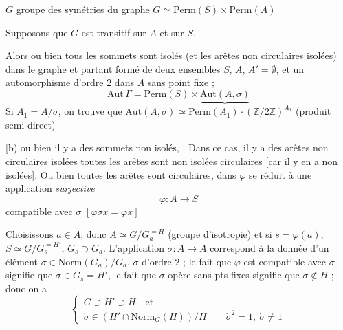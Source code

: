 \documentclass[11pt,a4paper]{article}
\begin{document}
$G$ groupe des symétries du graphe \qquad
$G \simeq \mathrm{Perm}(S) \times \mathrm{Perm}(A)$

Supposons que $G$ est transitif sur $A$ et sur $S$.

Alors \struck{\ill{}} ou bien tous les  sommets sont isolés (et
les arêtes non circulaires isolées) dans le graphe et partant formé de deux
ensembles $S$, $A$, $A' = \emptyset$, et un automorphisme d'ordre 2 dans $A$
\struck{\ill{}} sans point fixe ; 
\[
\mathrm{Aut}\,\Gamma = \mathrm{Perm}(S) \times \underbrace{\mathrm{Aut}(A, \sigma)}
\]
Si $A_1 = A/\sigma$, on trouve que $\mathrm{Aut}(A, \sigma) \simeq
\mathrm{Perm}(A_1) \cdot (\mathbb{Z}/2\mathbb{Z})^{A_1}$ (produit
semi-direct)


[b) ou bien  il y a des sommets non isolés,
\struck{\ill{}}. Dans ce cas, il y a des arêtes non circulaires isolées
\struck{\ill{}} toutes les arêtes sont non isolées circulaires [car il y en
a non isolées].  Ou bien toutes les arêtes sont
circulaires, dans  $\varphi$ se réduit à une application
\emph{surjective}
\[
\varphi : A \longrightarrow S
\]
compatible avec $\sigma$ $[\varphi\sigma x = \varphi x]$

 Choisissons $a \in A$, donc
$A \simeq G/G_a^{=H}$ (groupe d'isotropie) et si $s = \varphi(a)$,
$S \simeq G/G_s^{=H'}$, $G_s \supset G_a$. L'application $\sigma : A \to A$
correspond à la donnée d'un élément 
$\dot{\sigma} \in \mathrm{Norm}(G_a)/G_a$, $\dot{\sigma}$ d'ordre 2 ; le fait
que $\varphi$ \struck{\ill{}} est compatible avec $\sigma$ signifie que
$\sigma \in G_s = H'$, le fait que $\sigma$ opère sans pts fixes signifie que
$\sigma \notin H$ \struck{\ill{}} ; donc on a
\[
\left\{
\begin{array}{l}
\boxed{G \supset H' \supset H} \quad \text{et} \\
\boxed{\dot{\sigma} \in (H' \cap \mathrm{Norm}_G(H))/H \qquad \dot{\sigma}^2 = 1,\ \dot{\sigma} \neq 1}
\end{array}
\right.
\]
\end{document}
